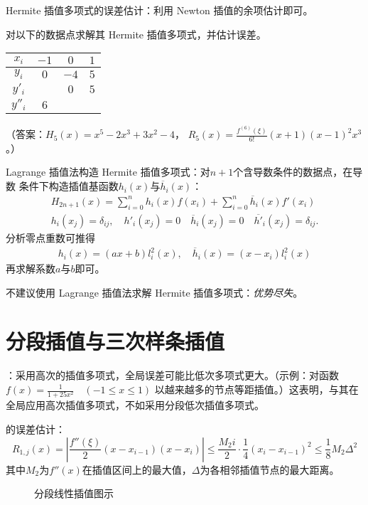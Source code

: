 \entry Hermite 插值多项式的误差估计：利用 Newton 插值的余项估计即可。

\example 对以下的数据点求解其 Hermite 插值多项式，并估计误差。
\begin{center}\small
\begin{tabular}{cccc}
\toprule
$x_i$&$-1$&$0$&$1$\\
\midrule
$y_i$&$0$&$-4$&$5$\\
$y'_i$&&$0$&$5$\\
$y''_i$&$6$&&\\
\bottomrule
\end{tabular}\end{center}
（答案：$H_5(x)=x^5-2x^3+3x^2-4$，
$R_5(x)=\frac{f^{(6)}(\xi)}{6!}(x+1)(x-1)^2x^3$。）

\entry Lagrange 插值法构造 Hermite 插值多项式：对$n+1$个含导数条件的数据点，在导数
条件下构造插值基函数$h_i(x)$与$\overline{h}_i(x)$：
\begin{gather}
H_{2n+1}(x)=\sum_{i=0}^nh_i(x)f(x_i)+\sum_{i=0}^n\overline{h}_i(x)f'(x_i)\\
h_i(x_j)=\delta_{ij},\quad h'_i(x_j)=0\quad\overline{h}_i(x_j)=0\quad
\overline{h'}_i(x_j)=\delta_{ij}.
\end{gather}
分析零点重数可推得
\begin{gather}
h_i(x)=(ax+b)l_i^2(x),\quad\overline{h}_i(x)=(x-x_i)l_i^2(x)
\end{gather}
再求解系数$a$与$b$即可。

\entry 不建议使用 Lagrange 插值法求解 Hermite 插值多项式：\emph{优势尽失}。

\section{分段插值与三次样条插值}
\entry {}：采用高次的插值多项式，全局误差可能比低次多项式更大。（示例：对函数 $f(x)=\frac1{1+25x^2}\quad(-1\leq x\leq 1)$ 以越来越多的节点等距插值。）这表明，与其在全局应用高次插值多项式，不如采用分段低次插值多项式。

\entry {}的误差估计：
\begin{equation}
R_{1,j}(x)=\left|\frac{f''(\xi)}2(x-x_{i-1})(x-x_i)\right|\leq\frac{M_2i}2\cdot
\frac14(x_i-x_{i-1})^2\leq\frac18M_2\Delta^2
\end{equation}
其中$M_2$为$f''(x)$在插值区间上的最大值，$\Delta$为各相邻插值节点的最大距离。

\begin{figure}[htbp]
\small\centering
{}
\caption{分段线性插值图示}\label{4-f3}
\end{figure}

